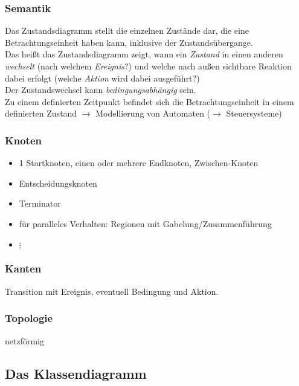 \documentclass{scrreprt}
\begin{document}
\subsubsection{Semantik}
Das Zustandsdiagramm stellt die einzelnen Zustände dar, die eine Betrachtungseinheit haben kann, inklusive der Zustandsübergange.\\
Das heißt das Zustandsdiagramm zeigt, wann ein \emph{Zustand} in einen anderen \emph{wechselt} (nach welchem \emph{Ereignis}?) und welche nach außen sichtbare Reaktion dabei erfolgt (welche \emph{Aktion} wird dabei ausgeführt?)\\
Der Zustandswechsel kann \emph{bedingungsabhängig} sein.\\
Zu einem definierten Zeitpunkt befindet sich die Betrachtungseinheit in einem definierten Zustand $\to$ Modellierung von Automaten ($\to$ Steuersysteme)


\subsubsection{Knoten}
\begin{itemize}
	\item 1 Startknoten, einen oder mehrere Endknoten, Zwischen-Knoten
	\item Entscheidungsknoten
	\item Terminator
	\item für paralleles Verhalten: Regionen mit Gabelung/Zusammenführung
	\item[] $\vdots$
\end{itemize}

\subsubsection{Kanten}
Transition mit Ereignis, eventuell Bedingung und Aktion.

\subsubsection{Topologie}
netzförmig

\subsection{Das Klassendiagramm}
\end{document}
